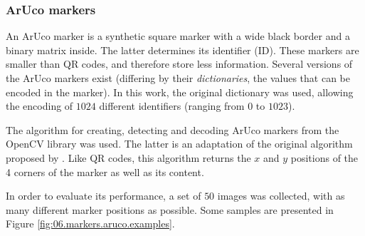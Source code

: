 \subsubsection{ArUco markers}

An ArUco marker \cite{garrido2014automatic} is a synthetic square marker with a wide black border and a binary matrix inside. The latter determines its identifier (ID). These markers are smaller than QR codes, and therefore store less information. Several versions of the ArUco markers exist (differing by their \emph{dictionaries}, \ie{} the values that can be encoded in the marker). In this work, the original dictionary was used, allowing the encoding of $\num{1024}$ different identifiers (ranging from $\num{0}$ to $\num{1023}$).

The algorithm for creating, detecting and decoding ArUco markers from the OpenCV library was used. The latter is an adaptation of the original algorithm proposed by \textcite{garrido2014automatic}. Like QR codes, this algorithm returns the $x$ and $y$ positions of the 4 corners of the marker as well as its content.

In order to evaluate its performance, a set of $\num{50}$ images was collected, with as many different marker positions as possible. Some samples are presented in Figure \ref{fig:06.markers.aruco.examples}.


